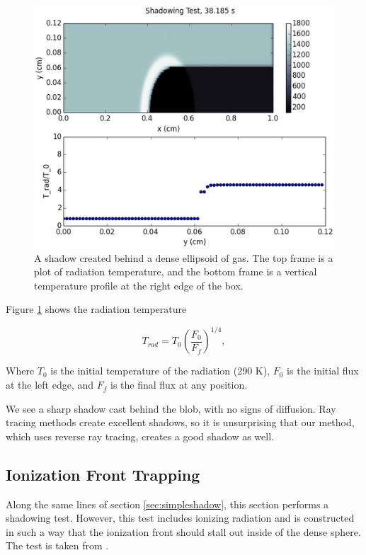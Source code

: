 \begin{figure}
\includegraphics[width=\textwidth]{graphics/shadow10000.eps}
\caption[Shadowing behind a dense clump.]{A shadow created behind a dense ellipsoid of gas. The top frame is a plot of radiation temperature, and the bottom frame is a vertical temperature profile at the right edge of the box.}
\label{fig:shadow}
\end{figure}

Figure \ref{fig:shadow} shows the radiation temperature

\begin{equation}
\label{eq:radtemp}
T_{rad} = T_0 \left(\frac{F_0}{F_f}\right)^{1/4},
\end{equation}

\noindent
Where $T_0$ is the initial temperature of the radiation (290 K), $F_0$ is the initial flux at the left edge, and $F_f$ is the final flux at any position.

We see a sharp shadow cast behind the blob, with no signs of diffusion. Ray tracing methods create excellent shadows, so it is unsurprising that our method, which uses reverse ray tracing, creates a good shadow as well.


\subsection{Ionization Front Trapping}
\label{sec:ifronttrapping}

Along the same lines of section \ref{sec:simpleshadow}, this section performs a shadowing test. However, this test includes ionizing radiation and is constructed in such a way that the ionization front should stall out inside of the dense sphere. The test is taken from \citet{ilievEt06}.

